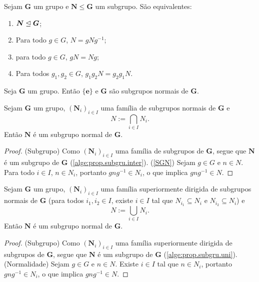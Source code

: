 \begin{prop}
Sejam $\bm G$ um grupo e $\bm N \leq \bm G$ um subgrupo. São equivalentes:
	\begin{enumerate}
	\item $\bm N \mathrel{\unlhd} \bm G$;
	\item Para todo $g \in G$, $N=gNg^{-1}$;
	\item para todo $g \in G$, $gN=Ng$;
	\item Para todos $g_1,g_2 \in G$, $g_1g_2N = g_2g_1N$.
	\end{enumerate}
\end{prop}

\begin{prop}
\label{alge:prop.subgrunor.triv}
Seja $\bm G$ um grupo. Então $\bm{\{e\}}$ e $\bm G$ são subgrupos normais de $\bm G$.
\end{prop}

\begin{prop}
\label{alge:prop.subgrunor.inter}
Sejam $\bm G$ um grupo, $(\bm N_i)_{i \in I}$ uma família de subgrupos normais de $\bm G$ e
	\begin{equation*}
	N := \bigcap_{i \in I} N_i.
	\end{equation*}
Então $\bm N$ é um subgrupo normal de $\bm G$.
\end{prop}
\begin{proof}
(Subgrupo) Como $(\bm N_i)_{i \in I}$ uma família de subgrupos de $\bm G$, segue que $\bm N$ é um subgrupo de $\bm G$ (\ref{alge:prop.subgru.inter}).
(\ref{SGN}) Sejam $g \in G$ e $n \in N$. Para todo $i \in I$, $n \in N_i$, portanto $gng^{-1} \in N_i$, o que implica $gng^{-1} \in N$.
\end{proof}

\begin{prop}
\label{alge:prop.subgrunor.uni}
Sejam $\bm G$ um grupo, $(\bm N_i)_{i \in I}$ uma família superiormente dirigida de subgrupos normais de $\bm G$ (para todos $i_1,i_2 \in I$, existe $i \in I$ tal que $N_{i_1} \subseteq N_i$ e $N_{i_2} \subseteq N_i$) e
	\begin{equation*}
	N := \bigcup_{i \in I} N_i.
	\end{equation*}
Então $\bm N$ é um subgrupo normal de $\bm G$.
\end{prop}
\begin{proof}
(Subgrupo) Como $(\bm N_i)_{i \in I}$ uma família superiormente dirigida de subgrupos de $\bm G$, segue que $\bm N$ é um subgrupo de $\bm G$ (\ref{alge:prop.subgru.uni}).
(Normalidade) Sejam $g \in G$ e $n \in N$. Existe $i \in I$ tal que $n \in N_i$, portanto $gng^{-1} \in N_i$, o que implica $gng^{-1} \in N$.
\end{proof}

